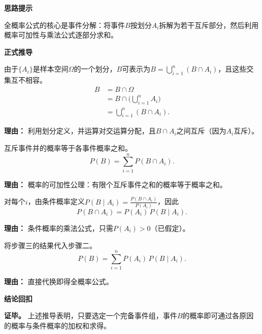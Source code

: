 \begin{proofbox}

	\textbf{\textcolor{CProof}{思路提示}}

	全概率公式的核心是事件分解：将事件$B$按划分$A_i$拆解为若干互斥部分，然后利用概率可加性与乘法公式逐部分求和。

	\medskip
	\textbf{\textcolor{CProof}{正式推导}}
	\begin{description}[style=nextline, leftmargin=2.8em, labelsep=0.5em, itemsep=0.55em]
		\item[\textbf{步骤一（事件分解）：}] 由于$\{A_i\}$是样本空间$\Omega$的一个划分，$B$可表示为$B=\bigcup_{i=1}^n (B\cap A_i)$，且这些交集互不相容。
			\[
				\begin{aligned}
					B &= B\cap\Omega \\
					&= B\cap\biggl(\bigcup_{i=1}^n A_i\biggr) \\
					&= \bigcup_{i=1}^n (B\cap A_i).
			\end{aligned}
			\]
			\par\textbf{理由：} 利用划分定义，并运算对交运算分配，且$B\cap A_i$之间互斥（因为$A_i$互斥）。

		\item[\textbf{步骤二（可加性）：}] 互斥事件并的概率等于各事件概率之和。
			\[
				P(B) = \sum_{i=1}^n P(B\cap A_i).
			\]
			\par\textbf{理由：} 概率的可加性公理：有限个互斥事件之和的概率等于概率之和。

		\item[\textbf{步骤三（乘法公式）：}] 对每个$i$，由条件概率定义$P(B\mid A_i) = \frac{P(B\cap A_i)}{P(A_i)}$，因此
			\[
				P(B\cap A_i) = P(A_i)\,P(B\mid A_i).
			\]
			\par\textbf{理由：} 条件概率的乘法公式，只需$P(A_i)>0$（已假定）。

		\item[\textbf{步骤四（代入求和）：}] 将步骤三的结果代入步骤二。
			\[
				P(B) = \sum_{i=1}^n P(A_i)\,P(B\mid A_i).
			\]
			\par\textbf{理由：} 直接代换即得全概率公式。
	\end{description}

	\medskip
	\textbf{\textcolor{CProof}{结论回扣}}

	\textbf{证毕。} 上述推导表明，只要选定一个完备事件组，事件$B$的概率即可通过各原因的概率与条件概率的加权和求得。
\end{proofbox}
